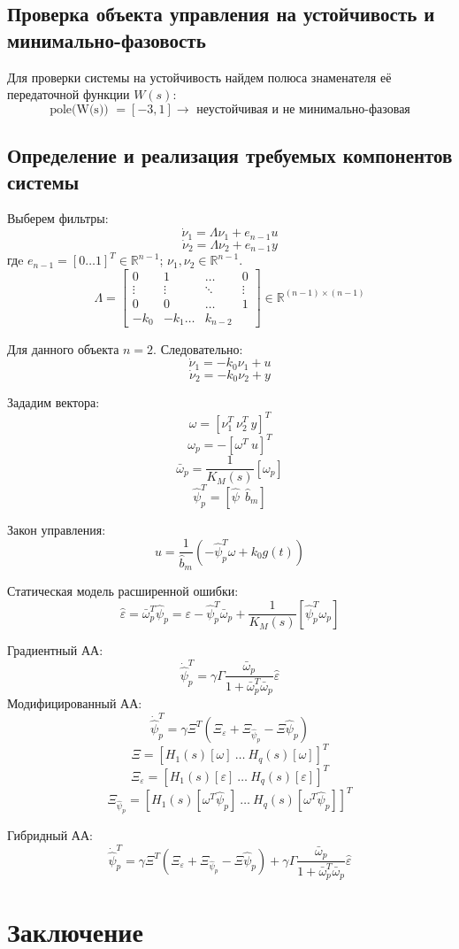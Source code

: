 \documentclass{article}
\begin{document}
\subsection{Проверка объекта управления на устойчивость и минимально-фазовость}
Для проверки системы на устойчивость найдем полюса знаменателя её передаточной функции \(W(s)\):
\[\text{pole(W(s)) } = [-3, 1] \rightarrow \text{ неустойчивая и не минимально-фазовая}\]

\subsection{Определение и реализация требуемых компонентов системы}
Выберем фильтры:
\[\dot \nu_1 = \Lambda \nu_1 + e_{n-1}u\]
\[\dot \nu_2 = \Lambda \nu_2 + e_{n-1}y\]
гдe \(e_{n-1} = [0 \hdots 1]^T \in \mathds{R}^{n-1}\); \(\nu_1, \nu_2 \in \mathds{R}^{n-1}\).
\[\Lambda = \begin{bmatrix}
  0 & 1 & \hdots & 0 \\
  \vdots & \vdots & \ddots & \vdots \\
  0 & 0 & \hdots & 1 \\
  -k_0 & -k_1 \hdots & k_{n- 2}
\end{bmatrix} \in \mathds{R}^{(n-1) \times (n-1)} \]

Для данного объекта \(n=2\). Следовательно:
\[\dot \nu_1 = -k_0 \nu_1 + u\]
\[\dot \nu_2 = -k_0 \nu_2 + y\]

Зададим вектора:
\[\omega = [\nu_1^T~\nu_2^T~y]^T\]
\[\omega_p = -[\omega^T~u]^T\]
\[\bar \omega_p = \frac{1}{K_M(s)}[\omega_p]\]
\[\hat{\psi}_p^T = [\hat \psi ~~ \hat b_m] \]

Закон управления:
\[u = \frac{1}{\hat{b}_m}(-\hat{\psi}_p^T \omega + k_0 g(t)) \]

Статическая модель расширенной ошибки:
\[\hat \varepsilon = \bar \omega_p^T \hat{\psi}_p =  \varepsilon - \hat{\psi}_p^T \bar \omega_p + \frac{1}{K_M(s)}[ \hat{\psi}_p^T \omega_p]\]

Градиентный АА:
\[\dot {\hat{\psi}}_p^T = \gamma \Gamma \frac{\bar \omega_p}{1 + \bar \omega_p^T \bar \omega_p} \hat \varepsilon\]
Модифицированный АА:
\[\dot {\hat{\psi}}_p^T = \gamma \Xi^T (\Xi_\varepsilon + \Xi_{\hat{\psi}_p} - \Xi \hat{\psi}_p)\]
\[\Xi = [H_1(s)[\omega]~\dots~H_q(s)[\omega]]^T\]
\[\Xi_\varepsilon = [H_1(s)[\varepsilon]~\dots~H_q(s)[\varepsilon]]^T\]
\[\Xi_{\hat{\psi}_p}  = [H_1(s)[\omega^T \hat{\psi}_p ]~\dots~H_q(s)[\omega^T \hat{\psi}_p ]]^T\]

Гибридный АА:
\[\dot {\hat{\psi}}_p^T = \gamma \Xi^T (\Xi_\varepsilon + \Xi_{\hat{\psi}_p} - \Xi \hat{\psi}_p) + \gamma \Gamma \frac{\bar \omega_p}{1 + \bar \omega_p^T \bar \omega_p} \hat \varepsilon\]


\FloatBarrier



\newpage
\section{Заключение}
\end{document}
